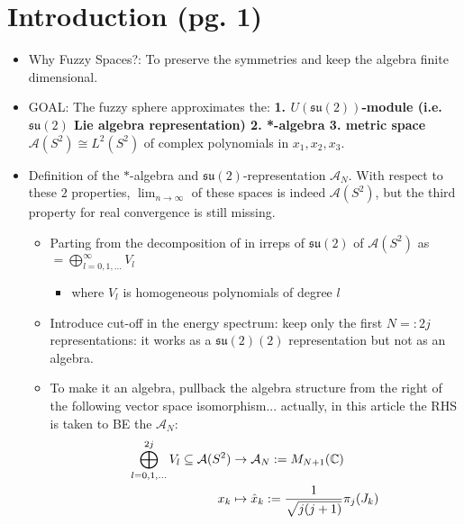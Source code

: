 \documentclass{article}
\newcommand{\alg}[1]{\ensuremath{\mathfrak{#1}}}
\newcommand{\sut}{\ensuremath{\mathfrak{su}(2)}}
\begin{document}
\section{Introduction (pg. 1)}

    \begin{itemize}
        
    \item Why Fuzzy Spaces?: To preserve the symmetries and keep the algebra finite dimensional.    
    
    \item GOAL: The fuzzy sphere approximates the: \textbf{1. $U(\alg{su}(2))$-module (i.e. $\alg{su}(2)$ Lie algebra representation) 2. *-algebra 3. metric space} $\mathcal A(S^2) \cong L^2(S^2)$ of complex polynomials in $x_1, x_2, x_3$.
        
    \item Definition of the $*$-algebra and $\alg{su(2)}$-representation $\mathcal A_N$. With respect to these $2$ properties, $\lim_{n \to \infty}$ of these spaces is indeed $\mathcal A(S^2)$, but the third property for real convergence is still missing.
    
        \begin{itemize}
            
        \item Parting from the decomposition of in irreps of $\alg{su}(2)$ of $\mathcal{A}(S^2)$ as $ = \bigoplus_{l =  0, 1, \dots}^\infty V_l$
        
            \begin{itemize}
                
            \item where $V_l$ is homogeneous polynomials of degree $l$
                
            \end{itemize}
        
        \item Introduce cut-off in the energy spectrum: keep only the first $N =: 2j$ representations: it works as a $\sut(2)$ representation but not as an algebra.
        
        \item To make it an algebra, pullback the algebra structure from the right of the following vector space isomorphism... actually, in this article the RHS is taken to BE the $\mathcal A_N$:
        \begin{align}
            \bigoplus_{l =  0, 1, \dots}^{2j} V_l \subseteq \mathcal{A}(S^2) &\to \mathcal A_N := M_{N+1}(\mathbb{C})\\
            x_k &\mapsto \hat x_k := \frac{1}{\sqrt{j(j+1)}}\pi_j(J_k)
        \end{align}
        

\end{itemize}
\end{itemize}
\end{document}
